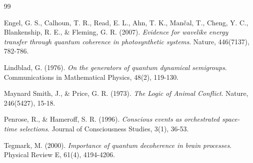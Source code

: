 \documentclass[12pt,openany]{book}
\begin{document}
\backmatter

\begin{thebibliography}{99}

Engel, G. S., Calhoun, T. R., Read, E. L., Ahn, T. K., Man\v{c}al, T., Cheng, Y. C., Blankenship, R. E., \& Fleming, G. R. (2007). \textit{Evidence for wavelike energy transfer through quantum coherence in photosynthetic systems}. Nature, 446(7137), 782-786.

Lindblad, G. (1976). \textit{On the generators of quantum dynamical semigroups}. Communications in Mathematical Physics, 48(2), 119-130.

Maynard Smith, J., \& Price, G. R. (1973). \textit{The Logic of Animal Conflict}. Nature, 246(5427), 15-18.

Penrose, R., \& Hameroff, S. R. (1996). \textit{Conscious events as orchestrated space-time selections}. Journal of Consciousness Studies, 3(1), 36-53.

Tegmark, M. (2000). \textit{Importance of quantum decoherence in brain processes}. Physical Review E, 61(4), 4194-4206.

\end{thebibliography}
\end{document}
